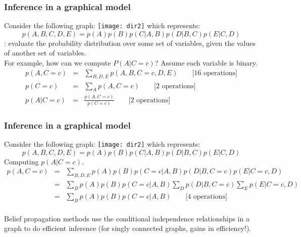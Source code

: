 





\begin{frame}
\frametitle{Inference in a graphical model}

Consider the following graph: \texttt{[image: dir2]}
which represents: \vspace*{-1ex}
\[
p(A,B,C,D,E) = p(A) p(B) p(C|A,B) p(D|B,C) p(E|C,D)
\]
: evaluate the probability distribution over some set
of variables, given the values of another set of variables. \\

For example, how can we compute $P(A|C=c)$? Assume each variable is binary. \\

{\small
\begin{eqnarray*}
p(A,C=c) &=& \sum_{B,D,E} p(A,B,C=c,D,E) \hspace{2em} \mbox{[16 operations]} \\ 
p(C=c) &=& \sum_{A} p(A,C=c) \hspace{2em} \mbox{[2 operations]} \\
p(A|C=c) &=& \frac{p(A,C=c)}{p(C=c)} \hspace{2em} \mbox{[2 operations]} 
\end{eqnarray*}
}

\end{frame}
\begin{frame}
\frametitle{Inference in a graphical model}

Consider the following graph: \texttt{[image: dir2]}
which represents: \vspace*{-1ex}
\[
p(A,B,C,D,E) = p(A) p(B) p(C|A,B) p(D|B,C) p(E|C,D)
\]
Computing $p(A|C=c)$.\\

{\small 
\begin{eqnarray*}
p(A,C=c) &=& \sum_{B,D,E} p(A)p(B)p(C=c|A,B)p(D|B,C=c)p(E|C=c,D)  \\
&=& \sum_{B} p(A)p(B)p(C=c|A,B) \sum_D p(D|B,C=c) \sum_E p(E|C=c,D)  \\
&=& \sum_{B} p(A)p(B)p(C=c|A,B) \hspace{2em} \mbox{[4 operations]}
\end{eqnarray*}
}
\\

Belief propagation methods use the conditional independence
relationships in a graph to do efficient inference (for singly
connected graphs,  gains in efficiency!).
\end{frame}
